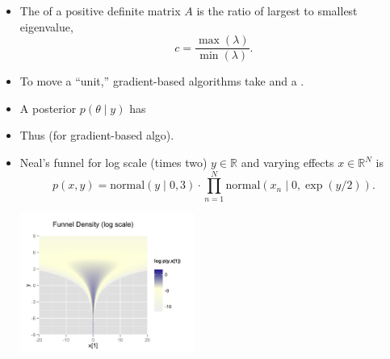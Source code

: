 \documentclass[10pt]{report}
\begin{document}
\begin{itemize}
\item The  of a positive definite matrix $A$ is the 
  ratio of largest to smallest eigenvalue,
  $$c = \frac{\max(\lambda)}{\min(\lambda)}.$$
\item To move a ``unit,'' gradient-based algorithms take  and a .
\item A posterior $p(\theta \mid y)$ has
\item Thus  (for
  gradient-based algo).
\end{itemize}

\begin{itemize}
  \item Neal's funnel for log scale (times two) $y \in \mathbb{R}$ and
    varying effects $x \in \mathbb{R}^N$ is
    $$ \textstyle 
    p(x, y) = \textrm{normal}(y \mid 0, 3) \cdot \prod_{n=1}^N 
    \textrm{normal}(x_n \mid 0, \exp(y / 2)). 
    $$
    \begin{center}
      \vspace*{-9pt}
    \includegraphics[width=2.25in]{img/funnel.png}
  \end{center}
\end{itemize}
\end{document}
